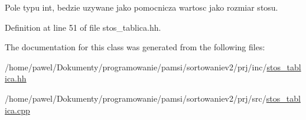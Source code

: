 Pole typu int, bedzie uzywane jako pomocnicza wartosc jako rozmiar stosu. 



Definition at line 51 of file stos\-\_\-tablica.\-hh.



The documentation for this class was generated from the following files\-:\begin{DoxyCompactItemize}
\item 
/home/pawel/\-Dokumenty/programowanie/pamsi/sortowaniev2/prj/inc/\hyperlink{stos__tablica_8hh}{stos\-\_\-tablica.\-hh}\item 
/home/pawel/\-Dokumenty/programowanie/pamsi/sortowaniev2/prj/src/\hyperlink{stos__tablica_8cpp}{stos\-\_\-tablica.\-cpp}\end{DoxyCompactItemize}
